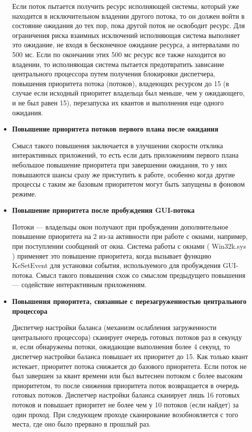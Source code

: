 \begin{itemize}
	Если поток пытается получить ресурс исполняющей системы, который уже находится в исключительном владении другого потока, то
	он должен войти в состояние ожидания до тех пор, пока другой поток не освободит ресурс. 
	Для ограничения риска взаимных исключений исполняющая система выполняет это ожидание, не входя в бесконечное ожидание ресурса, а интервалами по 500 мс.
	Если по окончании этих 500 мс ресурс все также находится во владении, то исполняющая система пытается предотвратить зависание
	центрального процессора путем получения блокировки диспетчера, повышения приоритета потока (потоков), владеющих ресурсом до 15
	(в случае если исходный приоритет владельца был меньше, чем у ожидающего, и не был равен 15), перезапуска их квантов и выполнения еще одного ожидания.
	
	\item \textbf{Повышение приоритета потоков первого плана после ожидания}
	
	Смысл такого повышения заключается в улучшении скорости отклика интерактивных приложений, то есть если дать приложениям первого плана небольшое повышение приоритета при завершении ожидания, то у них повышаются шансы сразу же приступить к работе,
	особенно когда другие процессы с таким же базовым приоритетом могут быть запущены в фоновом режиме.
	
	\item \textbf{Повышение приоритета после пробуждения GUI-потока}
	
	Потоки — владельцы окон получают при пробуждении дополнительное повышение приоритета на 2 из-за активности при работе с окнами, например, при поступлении сообщений от окна. Система работы с окнами ( Win32k.sys ) применяет это повышение приоритета, когда
	вызывает функцию KeSetEvent для установки события, используемого для пробуждения GUI-потока. 
	Смысл такого повышения схож со смыслом предыдущего повышения — содействие интерактивным приложениям.
	
	\item \textbf{Повышения приоритета, связанные с перезагруженностью центрального процессора}
	
	Диспетчер настройки баланса (механизм ослабления загруженности центрального процессора) сканирует очередь готовых потоков раз в
	секунду и, если обнаружены потоки, ожидающие выполнения более 4 секунд, то диспетчер настройки баланса повышает их приоритет
	до 15. Как только квант истекает, приоритет потока снижается до базового приоритета. 
	Если поток не был завершен за квант времени или был вытеснен потоком с более высоким приоритетом, то после
	снижения приоритета поток возвращается в очередь готовых потоков.
	Диспетчер настройки баланса сканирует лишь 16 готовых потоков и повышает приоритет не более чем у 10 потоков (если найдет) за один проход. 
	При следующем проходе сканирование возобновляется с того места, где оно было прервано в прошлый раз.
	

\end{itemize}
